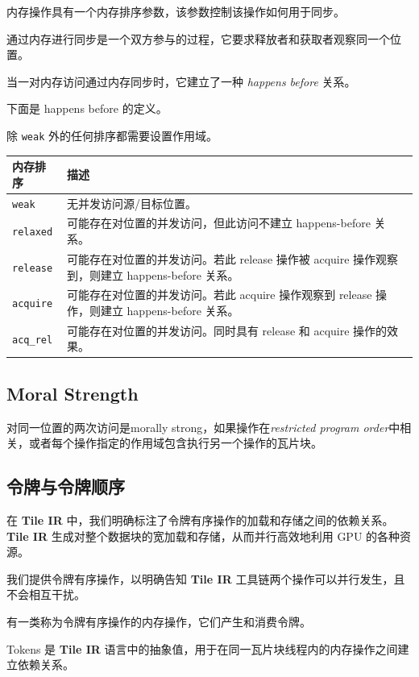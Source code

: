 \documentclass{article}
\begin{document}
内存操作具有一个内存排序参数，该参数控制该操作如何用于同步。

通过内存进行同步是一个双方参与的过程，它要求释放者和获取者观察同一个位置。

当一对内存访问通过内存同步时，它建立了一种 \textit{happens before} 关系。

下面是 happens before 的定义。


除 \texttt{weak} 外的任何排序都需要设置作用域。


\begin{longtable}{l|l}
\hline
内存排序 & 描述 \\ \hline
\texttt{weak} & 无并发访问源/目标位置。 \\ \hline
\texttt{relaxed} & 可能存在对位置的并发访问，但此访问不建立 happens-before 关系。 \\ \hline
\texttt{release} & 可能存在对位置的并发访问。若此 release 操作被 acquire 操作观察到，则建立 happens-before 关系。 \\ \hline
\texttt{acquire} & 可能存在对位置的并发访问。若此 acquire 操作观察到 release 操作，则建立 happens-before 关系。 \\ \hline
\texttt{acq\_rel} & 可能存在对位置的并发访问。同时具有 release 和 acquire 操作的效果。 \\ \hline
\end{longtable}


\subsection{Moral Strength}

对同一位置的两次访问是morally strong，如果操作在\textit{restricted program order}中相关，或者每个操作指定的作用域包含执行另一个操作的瓦片块。



\subsection{令牌与令牌顺序}

在 \textbf{Tile IR} 中，我们明确标注了令牌有序操作的加载和存储之间的依赖关系。\textbf{Tile IR} 生成对整个数据块的宽加载和存储，从而并行高效地利用 GPU 的各种资源。

我们提供令牌有序操作，以明确告知 \textbf{Tile IR} 工具链两个操作可以并行发生，且不会相互干扰。

有一类称为令牌有序操作的内存操作，它们产生和消费令牌。

Tokens 是 \textbf{Tile IR} 语言中的抽象值，用于在同一瓦片块线程内的内存操作之间建立依赖关系。
\end{document}

